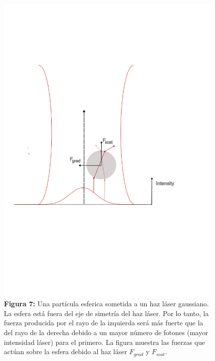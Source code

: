 \documentclass[10pt,aspectratio=1610,compress,dvipsnames]{beamer}
\begin{document}
\begin{frame}
{\begin{figure}
    \centering
    \includegraphics[trim={0cm 7.5cm 2cm 6cm },scale=0.37]{Imagenes teoria/Optical tweezer diagrams/finallyopticaltweezer.png}
    \captionsetup{labelformat=empty}
    \caption{\textbf{Figura 7:} Una part\'icula esferica sometida a un haz láser gaussiano. La esfera está fuera del eje de simetría del haz láser. Por lo tanto, la fuerza producida por el rayo de la izquierda será más fuerte que la del rayo de la derecha debido a un mayor número de fotones (mayor intensidad láser) para el primero. La figura muestra las fuerzas que actúan sobre la esfera debido al haz láser $F_{grad}$ y $F_{scat}$. }
    \label{Microscope inverted}
\end{figure}




}
\end{frame}
\end{document}
